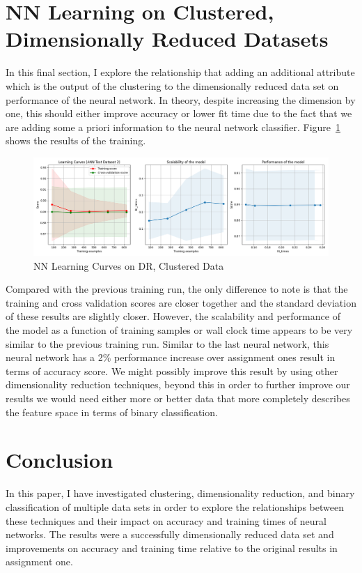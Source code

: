 \documentclass[11pt]{article}
\begin{document}
    \section{NN Learning on Clustered, Dimensionally Reduced Datasets}\label{sec:nn-learning-on-clustered,-dimensionally-reduced-datasets}
    In this final section, I explore the relationship that adding an additional attribute which is the output of the clustering to the dimensionally reduced data set on performance of the neural network.
    In theory, despite increasing the dimension by one, this should either improve accuracy or lower fit time due to the fact that we are adding some a priori information to the neural network classifier.
    Figure~\ref{Fig:NN Learning Curves on DR Clustered Data} shows the results of the training.
    \begin{figure}
        \centering
        \includegraphics[width=.9\linewidth]{ann2.png}
        \caption{NN Learning Curves on DR, Clustered Data}\label{Fig:NN Learning Curves on DR Clustered Data}
    \end{figure}
    Compared with the previous training run, the only difference to note is that the training and cross validation scores are closer together and the standard deviation of these results are slightly closer.
    However, the scalability and performance of the model as a function of training samples or wall clock time appears to be very similar to the previous training run.
    Similar to the last neural network, this neural network has a 2\% performance increase over assignment ones result in terms of accuracy score.
    We might possibly improve this result by using other dimensionality reduction techniques, beyond this in order to further improve our results we would need either more or better data that more completely describes the feature space in terms of binary classification.


    \section{Conclusion}\label{sec:conclusion}
    In this paper, I have investigated clustering, dimensionality reduction, and binary classification of multiple data sets in order to explore the relationships between these techniques and their impact on accuracy and training times of neural networks.
    The results were a successfully dimensionally reduced data set and improvements on accuracy and training time relative to the original results in assignment one.

    
    
\end{document}
